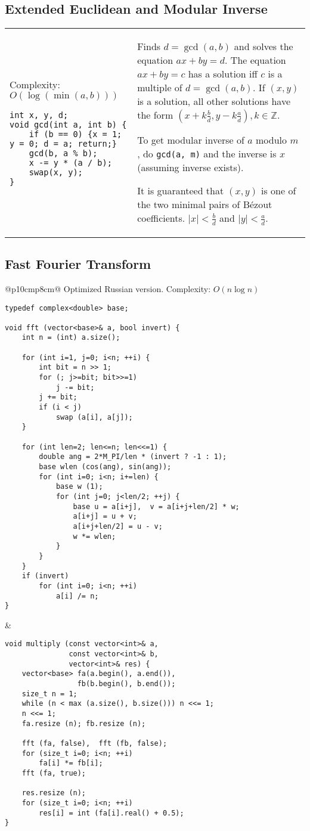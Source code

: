 \documentclass[letterpaper]{article}
\begin{document}
\subsection{Extended Euclidean and Modular Inverse}

\begin{tabular}{@{}p{9cm}p{9cm}@{}}
Complexity: $O\left(\log\left(\min\left(a,b\right)\right)\right)$

\begin{lstlisting}
int x, y, d;
void gcd(int a, int b) {
	if (b == 0) {x = 1; y = 0; d = a; return;}
	gcd(b, a % b);
	x -= y * (a / b);
	swap(x, y);
}
\end{lstlisting}
&
Finds $d=\gcd(a,b)$ and solves the equation $ax+by=d$. The equation $ax+by=c$ has a solution iff $c$ is a multiple of $d=\gcd(a,b)$. If $(x,y)$ is a solution, all other solutions have the form $(x + k\frac bd, y - k\frac ad), k\in\mathbb Z$.

To get modular inverse of $a$ modulo $m$, do \texttt{gcd(a, m)} and the inverse is $x$ (assuming inverse exists).

It is guaranteed that $(x,y)$ is one of the two minimal pairs of B\'ezout coefficients. $|x|<\frac{b}{d}$ and $|y|<\frac{a}{d}$.
\end{tabular}

\subsection{Fast Fourier Transform}
\begin{tabular}{@{}p{10cm}p{8cm}@{}}
Optimized Russian version. Complexity: $O\left(n\log n\right)$

\begin{lstlisting}
typedef complex<double> base;
 
void fft (vector<base>& a, bool invert) {
	int n = (int) a.size();
 
	for (int i=1, j=0; i<n; ++i) {
		int bit = n >> 1;
		for (; j>=bit; bit>>=1)
			j -= bit;
		j += bit;
		if (i < j)
			swap (a[i], a[j]);
	}
 
	for (int len=2; len<=n; len<<=1) {
		double ang = 2*M_PI/len * (invert ? -1 : 1);
		base wlen (cos(ang), sin(ang));
		for (int i=0; i<n; i+=len) {
			base w (1);
			for (int j=0; j<len/2; ++j) {
				base u = a[i+j],  v = a[i+j+len/2] * w;
				a[i+j] = u + v;
				a[i+j+len/2] = u - v;
				w *= wlen;
			}
		}
	}
	if (invert)
		for (int i=0; i<n; ++i)
			a[i] /= n;
}
\end{lstlisting}
&
\begin{lstlisting}
void multiply (const vector<int>& a,
               const vector<int>& b,
               vector<int>& res) {
	vector<base> fa(a.begin(), a.end()),
                 fb(b.begin(), b.end());
	size_t n = 1;
	while (n < max (a.size(), b.size())) n <<= 1;
	n <<= 1;
	fa.resize (n); fb.resize (n);
 
	fft (fa, false),  fft (fb, false);
	for (size_t i=0; i<n; ++i)
		fa[i] *= fb[i];
	fft (fa, true);
 
	res.resize (n);
	for (size_t i=0; i<n; ++i)
		res[i] = int (fa[i].real() + 0.5);
}
\end{lstlisting}
\end{tabular}
\end{document}
